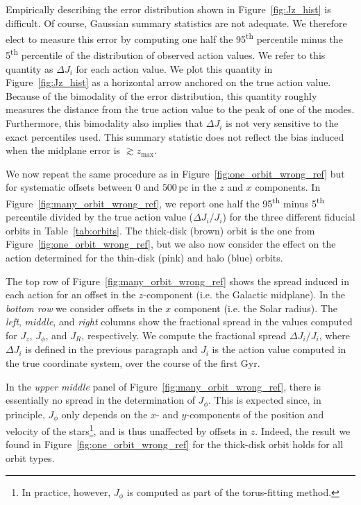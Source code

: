 \documentclass[twocolumn]{aastex62}
\newcommand{\pc}{\text{pc}}
\newcommand{\Gyr}{\text{Gyr}}
\newcommand{\uth}{\textsuperscript{th}}
\newcommand{\thincolor}{pink}
\newcommand{\thickcolor}{brown}
\newcommand{\halocolor}{blue}
\begin{document}
Empirically describing the error distribution shown in
Figure~\ref{fig:Jz_hist} is difficult. Of course, Gaussian summary statistics
are not adequate. We therefore elect to measure this error by computing one
half the 95\uth{} percentile minus the 5\uth{} percentile of the distribution
of observed action values. We refer to this quantity as $\Delta J_i$ for each
action value. We plot this quantity in Figure~\ref{fig:Jz_hist} as a
horizontal arrow anchored on the true action value. Because of the bimodality
of the error distribution, this quantity roughly measures the distance from
the true action value to the peak of one of the modes. Furthermore, this
bimodality also implies that $\Delta J_i$ is not very sensitive to the exact
percentiles used. This summary statistic does not reflect the bias induced
when the midplane error is $\gtrsim z_{\text{max}}$.

We now repeat the same procedure as in Figure~\ref{fig:one_orbit_wrong_ref}
but for systematic offsets between $0$ and $500\,\pc$ in the $z$ and $x$
components. In Figure~\ref{fig:many_orbit_wrong_ref}, we report one half the
95\uth{} minus 5\uth{} percentile divided by the true action value ($\Delta
J_i/J_i$) for the three different fiducial orbits in Table~\ref{tab:orbits}.
The thick-disk (\thickcolor) orbit is the one from
Figure~\ref{fig:one_orbit_wrong_ref}, but we also now consider the effect on
the action determined for the thin-disk (\thincolor) and halo (\halocolor)
orbits.

The top row of Figure~\ref{fig:many_orbit_wrong_ref} shows the spread induced
in each action for an offset in the $z$-component (i.e. the Galactic
midplane). In the {\em bottom row} we consider offsets in the $x$ component
(i.e. the Solar radius). The {\em left}, {\em middle}, and {\em right} columns
show the fractional spread in the values computed for $J_z$, $J_{\phi}$, and
$J_R$, respectively. We compute the fractional spread $\Delta J_i/J_i$, where
$\Delta J_i$ is defined in the previous paragraph and $J_i$ is the action
value computed in the true coordinate system, over the course of the first
$\Gyr$.

In the {\em upper middle} panel of Figure~\ref{fig:many_orbit_wrong_ref},
there is essentially no spread in the determination of $J_{\phi}$. This is
expected since, in principle, $J_{\phi}$ only depends on the $x$- and
$y$-components of the position and velocity of the stars\footnote{In practice,
however, $J_{\phi}$ is computed as part of the torus-fitting method.}, and is
thus unaffected by offsets in $z$. Indeed, the result we found in
Figure~\ref{fig:one_orbit_wrong_ref} for the thick-disk orbit holds for all
orbit types.
 
\end{document}
